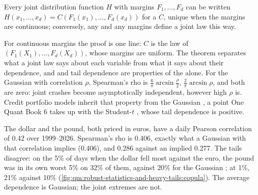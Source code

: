 \begin{theorem}[Sklar]\label{thm:qm:robust-statistics-and-heavy-tails:sklar}
Every joint distribution function $H$ with margins $F_1, \dots, F_d$ can be written $H(x_1, \dots, x_d) = C(F_1(x_1), \dots, F_d(x_d))$ for a
 $C$, unique when the margins are continuous; conversely, any  and any margins define a joint law this way.
\end{theorem}

For continuous margins the proof is one line: $C$ is the law of $(F_1(X_1), \dots, F_d(X_d))$, whose margins are uniform. The theorem
separates what a joint law says about each variable from what it says about their dependence, and  and tail dependence
are properties of the  alone. For the Gaussian  with correlation $\rho$, Spearman's rho is $\frac6\pi\arcsin\frac\rho2$,  $\frac2\pi\arcsin\rho$, and both  are zero: joint crashes become asymptotically independent, however high
$\rho$ is. Credit portfolio models inherit that property from the Gaussian , a point One Quant Book 6 takes up with the Student-$t$
, whose tail dependence is positive.

The dollar and the pound, both priced in euros, have a daily Pearson correlation of 0.42 over 1999--2026. Spearman's rho is 0.406, exactly
what a Gaussian  with that correlation implies (0.406), and  0.286 against an implied 0.277. The tails disagree: on the
5\% of days when the dollar fell most against the euro, the pound was in its own worst 5\% on 32\% of them, against 20\% for the Gaussian
; at 1\%, 21\% against 10\% (\cref{fig:qm:robust-statistics-and-heavy-tails:copula}). The average dependence is Gaussian; the joint
extremes are not.

